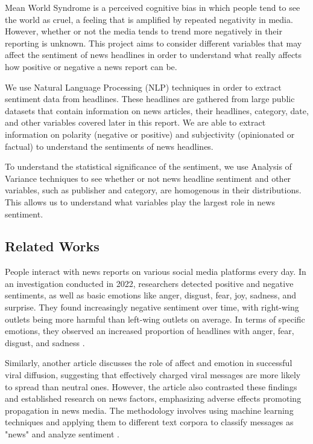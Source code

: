 \documentclass[12pt]{article}
\begin{document}
Mean World Syndrome is a perceived cognitive bias in which people tend to see the world as cruel, a feeling that is amplified by repeated negativity in media. However, whether or not the media tends to trend more negatively in their reporting is unknown. This project aims to consider different variables that may affect the sentiment of news headlines in order to understand what really affects how positive or negative a news report can be. 

We use Natural Language Processing (NLP) techniques in order to extract sentiment data from headlines. These headlines are gathered from large public datasets that contain information on news articles, their headlines, category, date, and other variables covered later in this report. We are able to extract information on polarity (negative or positive) and subjectivity (opinionated or factual) to understand the sentiments of news headlines. 

To understand the statistical significance of the sentiment, we use Analysis of Variance techniques to see whether or not news headline sentiment and other variables, such as publisher and category, are homogenous in their distributions. This allows us to understand what variables play the largest role in news sentiment. 


\subsection{Related Works}

People interact with news reports on various social media platforms every day. In an investigation conducted in 2022, researchers detected positive and negative sentiments, as well as basic emotions like anger, disgust, fear, joy, sadness, and surprise. They found increasingly negative sentiment over time, with right-wing outlets being more harmful than left-wing outlets on average. In terms of specific emotions, they observed an increased proportion of headlines with anger, fear, disgust, and sadness \cite{rozado2022}.

Similarly, another article discusses the role of affect and emotion in successful viral diffusion, suggesting that effectively charged viral messages are more likely to spread than neutral ones. However, the article also contrasted these findings and established research on news factors, emphasizing adverse effects promoting propagation in news media. The methodology involves using machine learning techniques and applying them to different text corpora to classify messages as "news" and analyze sentiment \cite{hansen2011}.
\end{document}
